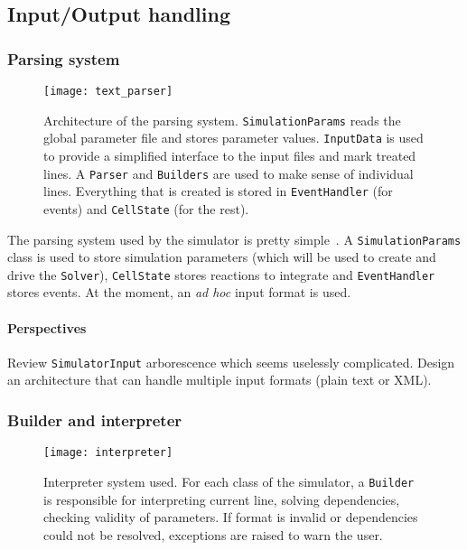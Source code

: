 
\subsection{Input/Output handling}

\subsubsection{Parsing system}

\begin{figure}[!h]
  \centering
  \texttt{[image: text\_parser]}
  \caption{Architecture of the parsing system. \texttt{SimulationParams} reads the global parameter file and stores parameter values. \texttt{InputData} is used to provide a simplified interface to the input files and mark treated lines. A \texttt{Parser} and \texttt{Builders} are used to make sense of individual lines. Everything that is created is stored in \texttt{EventHandler} (for events) and \texttt{CellState} (for the rest). }
  \label{fig:text_parser}
\end{figure}

The parsing system used by the simulator is pretty simple~. A \texttt{SimulationParams} class is used to store simulation parameters (which will be used to create and drive the \texttt{Solver}), \texttt{CellState} stores reactions to integrate and \texttt{EventHandler} stores events. At the moment, an \textit{ad hoc} input format is used.

\paragraph{Perspectives} Review \texttt{SimulatorInput} arborescence which seems uselessly complicated. Design an architecture that can handle multiple input formats (plain text or XML).

\subsubsection{Builder and interpreter}

\begin{figure}[!h]
  \centering
  \texttt{[image: interpreter]}
  \caption{Interpreter system used. For each class of the simulator, a \texttt{Builder} is responsible for interpreting current line, solving dependencies, checking validity of parameters. If format is invalid or dependencies could not be resolved, exceptions are raised to warn the user.}
  \label{fig:intepreter}
\end{figure}

